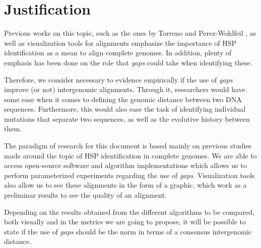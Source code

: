 \section{Justification}

Previous works on this topic, such as the ones by Torreno and Perez-Wohlfeil \cite{Tirado2015BreakingTC, PrezWohlfeil2019UltrafastGC}, as well as visualization tools for alignments \cite{Diaz2019MGV} emphasize the importance of HSP identification as a mean to align complete genomes. In addition, plenty of emphasis has been done on the role that \textit{gaps} could take when identifying these.

\medskip

Therefore, we consider necessary to evidence empirically if the use of \textit{gaps} improve (or not) intergenomic alignments. Through it, researchers would have some ease when it comes to defining the genomic distance between two DNA sequences. Furthermore, this would also ease the task of identifying individual mutations that separate two sequences, as well as the evolutive history between them.

\medskip

The paradigm of research for this document is based mainly on previous studies made around the topic of HSP identification in complete genomes. We are able to access open-source software and algorithm implementations which allows us to perform parameterized experiments regarding the use of \textit{gaps}. Visualization tools also allow us to see these alignments in the form of a graphic, which work as a preliminar results to see the quality of an alignment. 

\medskip

Depending on the results obtained from the different algorithms to be compared, both visually and in the metrics we are going to propose, it will be possible to state if the use of \textit{gaps} should be the norm in terms of a consensus intergenomic distance. 
